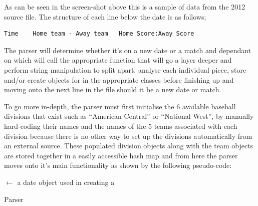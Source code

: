 As can be seen in the screen-shot above this is a sample of data from the 2012
source file. The structure of each line below the date is as follows;

\begin{verbatim}
Time 	Home team - Away team 	Home Score:Away Score
\end{verbatim}

The parser will determine whether it's on a new date or a match and dependant on
which will call the appropriate function that will go a layer deeper and perform
string manipulation to split apart, analyse each individual piece, store and/or
create objects for in the appropriate classes before finishing up and moving
onto the next line in the file should it be a new date or match.

To go more in-depth, the parser must first initialise the 6 available baseball
divisions that exist such as ``American Central'' or ``National West'', by
manually hard-coding their names and the names of the 5 teams associated with
each division because there is no other way to set up the divisions
automatically from an external source. These populated division objects along
with the team objects are stored together in a easily accessible hash map and
from here the parser moves onto it's main functionality as shown by the
following pseudo-code:

\IncMargin{2em}
\begin{algorithm}
  \SetAlgoLined
   
   
   

  \Date $\leftarrow$ a date object used in creating a \Match\;
    \caption{Parser}\label{PARSER}
\end{algorithm}
\DecMargin{2em}

\clearpage